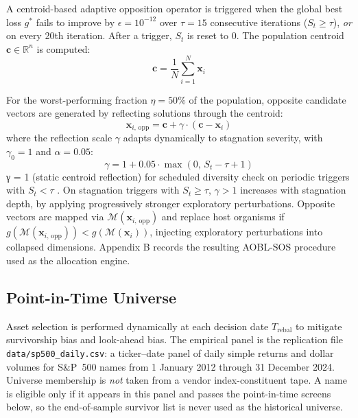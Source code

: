 \documentclass[11pt,a4paper]{article}
\begin{document}
A centroid-based adaptive opposition operator is triggered when the global best loss $g^*$ fails to improve by $\epsilon = 10^{-12}$ over $\tau = 15$ consecutive iterations ($S_t \ge \tau$), \emph{or} on every 20th iteration. After a trigger, $S_t$ is reset to $0$. The population centroid $\mathbf{c} \in \mathbb{R}^n$ is computed:
\begin{equation}
\mathbf{c} = \frac{1}{N} \sum_{i=1}^N \mathbf{x}_i
\end{equation}

For the worst-performing fraction $\eta = 50\%$ of the population, opposite candidate vectors are generated by reflecting solutions through the centroid:
\begin{equation}
\mathbf{x}_{i, \, \text{opp}} = \mathbf{c} + \gamma \cdot (\mathbf{c} - \mathbf{x}_i)
\end{equation}
where the reflection scale $\gamma$ adapts dynamically to stagnation severity, with $\gamma_0=1$ and $\alpha=0.05$:
\begin{equation}
\gamma = 1 + 0.05 \cdot \max\left(0, \, S_t - \tau + 1\right)
\end{equation}
γ = 1 (static centroid reflection) for scheduled diversity check on periodic triggers with $S_t < \tau$ . On stagnation triggers with $S_t \ge \tau$, $\gamma>1$ increases with stagnation depth, by applying progressively stronger exploratory perturbations. Opposite vectors are mapped via $\mathcal{M}(\mathbf{x}_{i, \, \text{opp}})$ and replace host organisms if $g(\mathcal{M}(\mathbf{x}_{i, \, \text{opp}})) < g(\mathcal{M}(\mathbf{x}_i))$, injecting exploratory perturbations into collapsed dimensions. Appendix B records the resulting AOBL-SOS procedure used as the allocation engine.

\subsection{Point-in-Time Universe}
\label{sec:universe}
Asset selection is performed dynamically at each decision date $T_{\text{rebal}}$ to mitigate survivorship bias and look-ahead bias. The empirical panel is the replication file \texttt{data/sp500\_daily.csv}: a ticker--date panel of daily simple returns and dollar volumes for S\&P~500 names from 1 January 2012 through 31 December 2024. Universe membership is \emph{not} taken from a vendor index-constituent tape. A name is eligible only if it appears in this panel and passes the point-in-time screens below, so the end-of-sample survivor list is never used as the historical universe.
\end{document}
